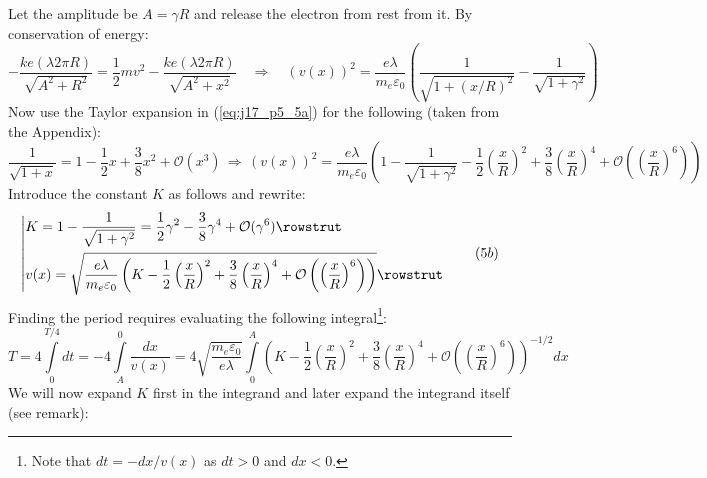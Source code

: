 \begin{description}[leftmargin=!, labelwidth=\widthof{$\bullet$}]
	Let the amplitude be $A = \gamma R$ and release the electron from rest from it. By conservation of energy:
	\begin{equation*}
		- \frac{k e (\lambda 2 \pi R)}{\sqrt{A^2 + R^2}} 
		=
		\frac{1}{2} m v^2 
		-
		\frac{k e (\lambda 2 \pi R)}{\sqrt{A^2 + x^2}}
		\quad\Rightarrow\quad
		\boxed{
		(v(x))^2 = 
			\frac{e \lambda}{m_e \varepsilon_0}
			\left(
			\frac{1}{\sqrt{1 + (x/R)^2}}
			-
			\frac{1}{\sqrt{1 + \gamma^2}}
			\right)
		}
		\tag{$5a$}
		\label{eq:j17_p5_5a}
	\end{equation*}
	Now use the Taylor expansion in (\ref{eq:j17_p5_5a}) for the following (taken from the Appendix):
	\begin{equation*}
		\frac{1}{\sqrt{1+x}} = 1 - \frac{1}{2} x + \frac{3}{8} x^2 + \mathcal{O}(x^3)
		\,\Rightarrow\,
		(v(x))^2 = \frac{e\lambda}{m_e \varepsilon_0}
		\left(
		1 -
		\frac{1}{\sqrt{1 + \gamma^2}}
		-
		\frac{1}{2} \left(\frac{x}{R}\right)^2
		+
		\frac{3}{8} \left(\frac{x}{R}\right)^4
		+
		\mathcal{O}\left(\left(\frac{x}{R}\right)^6\right)
		\right)
	\end{equation*}
	Introduce the constant $K$ as follows and rewrite:
	\begin{equation*}
		\left|
		\begin{aligned}
			& K = 1 - \frac{1}{\sqrt{1 + \gamma^2}} 
			=
			\frac{1}{2} \gamma^2 
			-
			\frac{3}{8} \gamma^4
			+
			\mathcal{O}(\gamma^6)
			\rowstrut
			\\
			& v(x) =
			\sqrt{
			\frac{e\lambda}{m_e \varepsilon_0}
			\left(
			K - \frac{1}{2} \left(\frac{x}{R}\right)^2
			+
			\frac{3}{8} \left(\frac{x}{R}\right)^4
			+
			\mathcal{O}\left(\left(\frac{x}{R}\right)^6\right)
			\right)
			}
			\rowstrut
		\end{aligned}
		\right.
		\tag{$5b$}
		\label{eq:j17_p5_5b}
	\end{equation*}
	Finding the period requires evaluating the following integral\footnote{Note that $dt = - dx / v(x)$ as $dt > 0$ and $dx < 0$.}:
	\begin{equation*}
		T = 4\int\limits_{0}^{T/4} dt =  
		- 4 \int\limits_{A}^{0} \frac{dx}{v(x)}
		=
		4 \sqrt{\frac{m_e \varepsilon_0}{e \lambda}}
		\int\limits_{0}^{A}
		\left(
		K - \frac{1}{2} \left(\frac{x}{R}\right)^2
		+
		\frac{3}{8} \left(\frac{x}{R}\right)^4
		+
		\mathcal{O}\left(\left(\frac{x}{R}\right)^6\right)
		\right)^{-1/2}
		dx
	\end{equation*}
	We will now expand $K$ first in the integrand and later expand the integrand itself (see remark):
	\begin{equation*}

\end{equation*}
\end{description}
